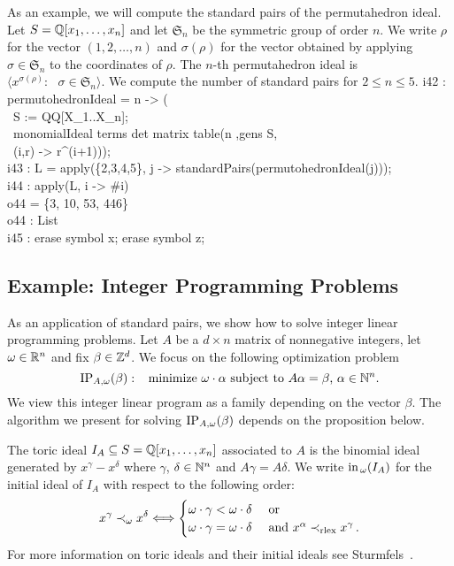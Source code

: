 As an example, we will compute the standard pairs of the permutahedron
ideal. Let $S = {\mathbb Q}[x_1, \dotsc, x_n]$
and let $\mathfrak{S}_n$ be the symmetric group of order $n$.  We
write $\rho$ for the vector $(1, 2, \dotsc, n)$ and $\sigma(\rho)$ for
the vector obtained by applying $\sigma \in \mathfrak{S}_n$ to the
coordinates of $\rho$. The $n$-th permutahedron ideal is $\langle
x^{\sigma(\rho)} : \text{ $\sigma \in \mathfrak{S}_n$} \rangle$.  We
compute the number of standard pairs for $2 \leq n \leq 5$.
\beginOutput
i42 : permutohedronIdeal = n -> (\\
\           S := QQ[X_1..X_n];\\
\           monomialIdeal terms det matrix table(n ,gens S, \\
\                (i,r) -> r^(i+1)));\\
\endOutput
\beginOutput
i43 : L = apply(\{2,3,4,5\}, j -> standardPairs(permutohedronIdeal(j)));\\
\endOutput
\beginOutput
i44 : apply(L, i -> #i)\\
\emptyLine
o44 = \{3, 10, 53, 446\}\\
\emptyLine
o44 : List\\
\endOutput
\beginOutput
i45 : erase symbol x; erase symbol z;\\
\endOutput


\subsection*{Example: Integer Programming Problems}

As an application of standard pairs, we show how
to solve integer linear programming problems.
Let $A$ be a $d \times n$ matrix of nonnegative integers, let $\omega
\in {\mathbb R}^{n}$ and fix $\beta \in {\mathbb Z}^{d}$.  We focus on the
following optimization problem
\[
\operatorname{IP}_{A,\omega}(\beta) : \,\,\, \text{ minimize $\omega \cdot \alpha$
subject to $A \alpha = \beta$, $\alpha \in {\mathbb N}^n$.}
\] 
We view this integer linear program as a family depending on the
vector $\beta$.  The algorithm we present for solving
$\operatorname{IP}_{A,\omega}(\beta)$ depends on the proposition below.

The toric ideal $I_{A} \subseteq
S = {\mathbb Q}[x_{1}, \dotsc, x_{n}]$ associated to $A$ is the binomial
ideal generated by $x^{\gamma} - x^{\delta}$ where $\gamma$, $\delta
\in {\mathbb N}^{n}$ and $A \gamma = A \delta$.  We write $\operatorname{in}_{\,
\omega}(I_{A})$ for the initial ideal of $I_A$
with respect to the following order:
\[
x^{\gamma} \prec_{\omega} x^{\delta} \Longleftrightarrow \begin{cases}
\omega \cdot \gamma < \omega \cdot \delta & \text{ or } \\ 
\omega \cdot \gamma = \omega \cdot \delta & \text{ and } x^{\alpha}
\prec_{{\rm rlex}} x^{\gamma} \, .
\end{cases}
\]
For more information on toric ideals and their initial ideals see
Sturmfels~\cite{MR97b:13034}.

